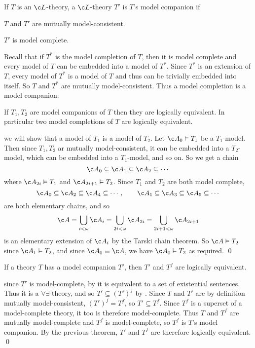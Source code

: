 \bdefn

    If $T$ is an $\c L$-theory, a $\c L$-theory $T'$ is $T$'s {\emphcolor model companion} if
    \benum
        \item $T$ and $T'$ are mutually model-consistent.
        \item $T'$ is model complete.
    \eenum

\edefn

Recall that if $T^*$ is the model completion of $T$, then it is model complete and every model of $T$ can be embedded into a model of $T^*$.
Since $T^*$ is an extension of $T$, every model of $T^*$ is a model of $T$ and thus can be trivially embedded into itself.
So $T$ and $T^*$ are mutually model-consistent.
Thus a model completion is a model companion.

\bthrm

    If $T_1,T_2$ are model companions of $T$ then they are logically equivalent.
    In particular two model completions of $T$ are logically equivalent.

\ethrm

\Proof we will show that a model of $T_1$ is a model of $T_2$.
Let $\c A_0\vDash T_1$ be a $T_1$-model.
Then since $T_1,T_2$ ar mutually model-consistent, it can be embedded into a $T_2$-model, which can be embedded into a $T_1$-model, and so on.
So we get a chain
$$ \c A_0\subseteq\c A_1\subseteq\c A_2\subseteq\cdots $$
where $\c A_{2i}\vDash T_1$ and $\c A_{2i+1}\vDash T_2$.
Since $T_1$ and $T_2$ are both model complete,
$$ \c A_0\subseteq\c A_2\subseteq\c A_4\subseteq\cdots,\qquad \c A_1\subseteq\c A_3\subseteq\c A_5\subseteq\cdots $$
are both elementary chains, and so
$$ \c A = \bigcup_{i<\omega}\c A_i = \bigcup_{2i<\omega}\c A_{2i} = \bigcup_{2i+1<\omega}\c A_{2i+1} $$
is an elementary extension of $\c A_i$ by the Tarski chain theorem.
So $\c A\vDash T_2$ since $\c A_1\vDash T_2$, and since $\c A_0\equiv\c A$, we have $\c A_0\vDash T_2$ as required.
\qed

\bcoro

    If a theory $T$ has a model companion $T'$, then $T'$ and $T^f$ are logically equivalent.

\ecoro

\Proof since $T'$ is model-complete, by  it is equivalent to a set of existential sentences.
Thus it is a $\forall\exists$-theory, and so $T'\subseteq(T')^f$ by .
Since $T$ and $T'$ are by definition mutually model-consistent, $(T')^f=T^f$, so $T'\subseteq T^f$.
Since $T^f$ is a superset of a model-complete theory, it too is therefore model-complete.
Thus $T$ and $T^f$ are mutually model-complete and $T^f$ is model-complete, so $T^f$ is $T$'s model companion.
By the previous theorem, $T'$ and $T^f$ are therefore logically equivalent.
\qed


